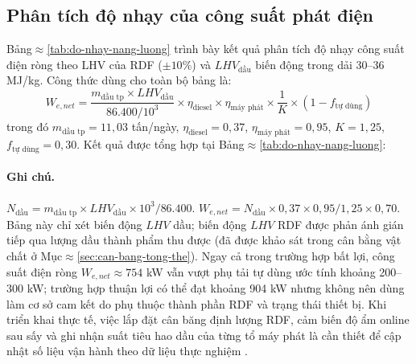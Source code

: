 \documentclass[../main.tex]{subfiles}
\begin{document}
\subsection{Phân tích độ nhạy của công suất phát điện}

Bảng$\approx$\ref{tab:do-nhay-nang-luong} trình bày kết quả phân tích độ nhạy công suất điện ròng theo LHV của RDF ($\pm 10\%$) và $LHV_{\text{dầu}}$ biến động trong dải $30$--$36$ MJ/kg. Công thức dùng cho toàn bộ bảng là:
\begin{equation}
  W_{e,net} = \frac{m_{\text{dầu tp}} \times LHV_{\text{dầu}}}{86.400/10^3} \times \eta_{\text{diesel}} \times \eta_{\text{máy phát}} \times \frac{1}{K} \times (1 - f_{\text{tự dùng}})
\end{equation}
trong đó $m_{\text{dầu tp}}=11{,}03$ tấn/ngày, $\eta_{\text{diesel}}=0{,}37$, $\eta_{\text{máy phát}}=0{,}95$, $K=1{,}25$, $f_{\text{tự dùng}}=0{,}30$. Kết quả được tổng hợp tại Bảng$\approx$\ref{tab:do-nhay-nang-luong}:

\begin{table}[htbp]
\centering
\caption{Phân tích độ nhạy công suất điện ròng theo $LHV_{\text{dầu}}$}
\label{tab:do-nhay-nang-luong}
\setlength{\tabcolsep}{5pt}
\end{table}
\paragraph*{Ghi chú.} $N_{\text{dầu}} = m_{\text{dầu tp}} \times LHV_{\text{dầu}} \times 10^3 / 86.400$. $W_{e,net} = N_{\text{dầu}} \times 0{,}37 \times 0{,}95 / 1{,}25 \times 0{,}70$. Bảng này chỉ xét biến động $LHV$ dầu; biến động $LHV$ RDF được phản ánh gián tiếp qua lượng dầu thành phẩm thu được (đã được khảo sát trong cân bằng vật chất ở Mục$\approx$\ref{sec:can-bang-tong-the}). Ngay cả trong trường hợp bất lợi, công suất điện ròng $W_{e,net} \approx 754$ kW vẫn vượt phụ tải tự dùng ước tính khoảng 200--300 kW; trường hợp thuận lợi có thể đạt khoảng 904 kW nhưng không nên dùng làm cơ sở cam kết do phụ thuộc thành phần RDF và trạng thái thiết bị. Khi triển khai thực tế, việc lắp đặt cân băng định lượng RDF, cảm biến độ ẩm online sau sấy và ghi nhận suất tiêu hao dầu của từng tổ máy phát là cần thiết để cập nhật số liệu vận hành theo dữ liệu thực nghiệm \cite{Sharuddin2016,Williams2007}.
\end{document}
